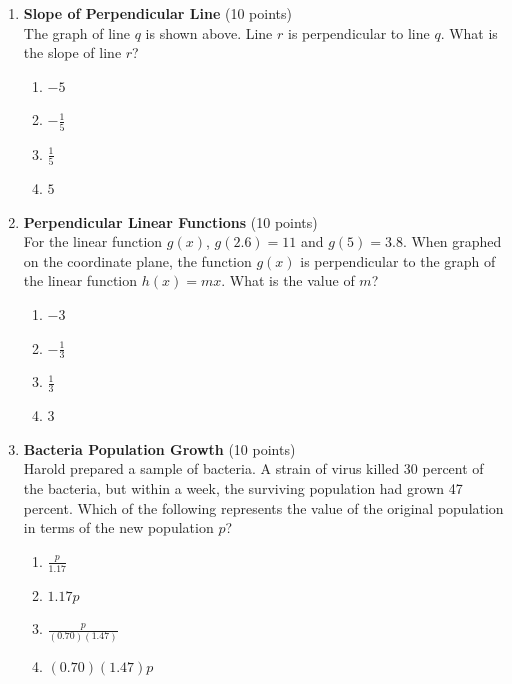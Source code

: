 \begin{enumerate}
  \newpage




  \item \textbf{Slope of Perpendicular Line} (10 points)\\
  The graph of line $q$ is shown above. Line $r$ is perpendicular to line $q$. What is the slope of line $r$?
  \begin{enumerate}[label=(\Alph*)]
    \item $-5$
    \item $-\frac{1}{5}$
    \item $\frac{1}{5}$
    \item $5$
  \end{enumerate}
  \begin{subanswer}
  \end{subanswer}



  \item \textbf{Perpendicular Linear Functions} (10 points)\\
  For the linear function $g(x)$, $g(2.6) = 11$ and $g(5) = 3.8$. When graphed on the coordinate plane, the function $g(x)$ is perpendicular to the graph of the linear function $h(x) = m x$. What is the value of $m$?
  \begin{enumerate}[label=(\Alph*)]
    \item $-3$
    \item $-\frac{1}{3}$
    \item $\frac{1}{3}$
    \item $3$
  \end{enumerate}
  \begin{subanswer}
  \end{subanswer}



  \newpage




  \item \textbf{Bacteria Population Growth} (10 points)\\
  Harold prepared a sample of bacteria. A strain of virus killed 30 percent of the bacteria, but within a week, the surviving population had grown 47 percent. Which of the following represents the value of the original population in terms of the new population $p$?
  \begin{enumerate}[label=(\Alph*)]
    \item $\frac{p}{1.17}$
    \item $1.17p$
    \item $\frac{p}{(0.70)(1.47)}$
    \item $(0.70)(1.47)p$
  \end{enumerate}
  \begin{subanswer}
  \end{subanswer}




\end{enumerate}
